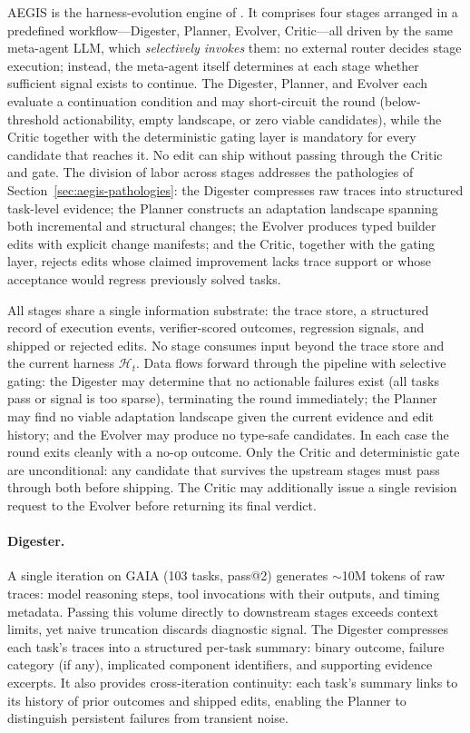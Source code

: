 AEGIS is the harness-evolution engine of \ProjectName. It comprises four stages arranged in a predefined workflow---Digester, Planner, Evolver, Critic---all driven by the same meta-agent LLM, which \textit{selectively invokes} them: no external router decides stage execution; instead, the meta-agent itself determines at each stage whether sufficient signal exists to continue. The Digester, Planner, and Evolver each evaluate a continuation condition and may short-circuit the round (below-threshold actionability, empty landscape, or zero viable candidates), while the Critic together with the deterministic gating layer is mandatory for every candidate that reaches it. No edit can ship without passing through the Critic and gate. The division of labor across stages addresses the pathologies of Section~\ref{sec:aegis-pathologies}: the Digester compresses raw traces into structured task-level evidence; the Planner constructs an adaptation landscape spanning both incremental and structural changes; the Evolver produces typed builder edits with explicit change manifests; and the Critic, together with the gating layer, rejects edits whose claimed improvement lacks trace support or whose acceptance would regress previously solved tasks.



All stages share a single information substrate: the trace store, a structured record of execution events, verifier-scored outcomes, regression signals, and shipped or rejected edits. No stage consumes input beyond the trace store and the current harness $\mathcal{H}_t$. Data flows forward through the pipeline with selective gating: the Digester may determine that no actionable failures exist (all tasks pass or signal is too sparse), terminating the round immediately; the Planner may find no viable adaptation landscape given the current evidence and edit history; and the Evolver may produce no type-safe candidates. In each case the round exits cleanly with a no-op outcome. Only the Critic and deterministic gate are unconditional: any candidate that survives the upstream stages must pass through both before shipping. The Critic may additionally issue a single revision request to the Evolver before returning its final verdict.

\paragraph{Digester.}
A single iteration on GAIA (103 tasks, pass@2) generates ${\sim}$10M tokens of raw traces: model reasoning steps, tool invocations with their outputs, and timing metadata. Passing this volume directly to downstream stages exceeds context limits, yet naive truncation discards diagnostic signal. The Digester compresses each task's traces into a structured per-task summary: binary outcome, failure category (if any), implicated component identifiers, and supporting evidence excerpts. It also provides cross-iteration continuity: each task's summary links to its history of prior outcomes and shipped edits, enabling the Planner to distinguish persistent failures from transient noise.

